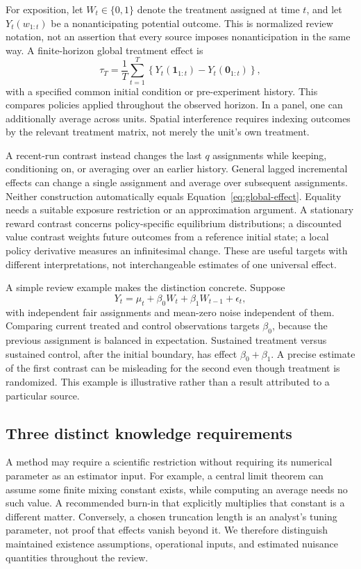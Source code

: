 \documentclass[12pt]{article}
\begin{document}
For exposition, let $W_t\in\{0,1\}$ denote the treatment assigned at time $t$, and let $Y_t(w_{1:t})$ be a nonanticipating potential outcome. This is normalized review notation, not an assertion that every source imposes nonanticipation in the same way. A finite-horizon global treatment effect is
\begin{equation}\label{eq:global-effect}
 \tau_T=\frac{1}{T}\sum_{t=1}^{T}
 \left\{Y_t(\mathbf{1}_{1:t})-Y_t(\mathbf{0}_{1:t})\right\},
\end{equation}
with a specified common initial condition or pre-experiment history. This compares policies applied throughout the observed horizon. In a panel, one can additionally average across units. Spatial interference requires indexing outcomes by the relevant treatment matrix, not merely the unit's own treatment.

A recent-run contrast instead changes the last $q$ assignments while keeping, conditioning on, or averaging over an earlier history. General lagged incremental effects can change a single assignment and average over subsequent assignments. Neither construction automatically equals Equation~\eqref{eq:global-effect}. Equality needs a suitable exposure restriction or an approximation argument. A stationary reward contrast concerns policy-specific equilibrium distributions; a discounted value contrast weights future outcomes from a reference initial state; a local policy derivative measures an infinitesimal change. These are useful targets with different interpretations, not interchangeable estimates of one universal effect.

A simple review example makes the distinction concrete. Suppose
\[
 Y_t=\mu_t+\beta_0W_t+\beta_1W_{t-1}+\epsilon_t,
\]
with independent fair assignments and mean-zero noise independent of them. Comparing current treated and control observations targets $\beta_0$, because the previous assignment is balanced in expectation. Sustained treatment versus sustained control, after the initial boundary, has effect $\beta_0+\beta_1$. A precise estimate of the first contrast can be misleading for the second even though treatment is randomized. This example is illustrative rather than a result attributed to a particular source.

\subsection{Three distinct knowledge requirements}

A method may require a scientific restriction without requiring its numerical parameter as an estimator input. For example, a central limit theorem can assume some finite mixing constant exists, while computing an average needs no such value. A recommended burn-in that explicitly multiplies that constant is a different matter. Conversely, a chosen truncation length is an analyst's tuning parameter, not proof that effects vanish beyond it. We therefore distinguish maintained existence assumptions, operational inputs, and estimated nuisance quantities throughout the review.
\end{document}
